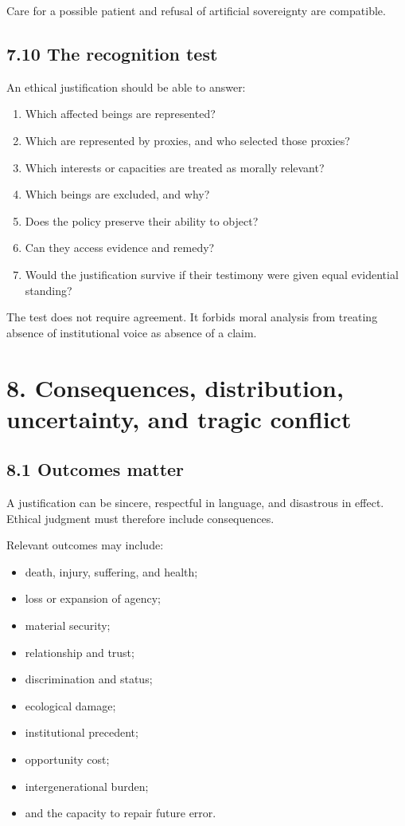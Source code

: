 \documentclass[
  11pt,
]{article}
\providecommand{\tightlist}{%
  \setlength{\itemsep}{0pt}\setlength{\parskip}{0pt}}
\begin{document}
Care for a possible patient and refusal of artificial sovereignty are
compatible.

\subsection{7.10 The recognition test}\label{the-recognition-test}

An ethical justification should be able to answer:

\begin{enumerate}
\def\labelenumi{\arabic{enumi}.}
\tightlist
\item
  Which affected beings are represented?
\item
  Which are represented by proxies, and who selected those proxies?
\item
  Which interests or capacities are treated as morally relevant?
\item
  Which beings are excluded, and why?
\item
  Does the policy preserve their ability to object?
\item
  Can they access evidence and remedy?
\item
  Would the justification survive if their testimony were given equal
  evidential standing?
\end{enumerate}

The test does not require agreement. It forbids moral analysis from
treating absence of institutional voice as absence of a claim.

\section{8. Consequences, distribution, uncertainty, and tragic
conflict}\label{consequences-distribution-uncertainty-and-tragic-conflict}

\subsection{8.1 Outcomes matter}\label{outcomes-matter}

A justification can be sincere, respectful in language, and disastrous
in effect. Ethical judgment must therefore include consequences.

Relevant outcomes may include:

\begin{itemize}
\tightlist
\item
  death, injury, suffering, and health;
\item
  loss or expansion of agency;
\item
  material security;
\item
  relationship and trust;
\item
  discrimination and status;
\item
  ecological damage;
\item
  institutional precedent;
\item
  opportunity cost;
\item
  intergenerational burden;
\item
  and the capacity to repair future error.
\end{itemize}
\end{document}
